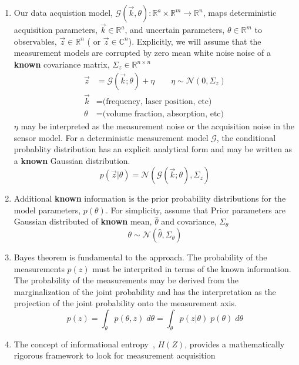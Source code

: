\documentclass{article}         %
\theoremstyle{definition}
\theoremstyle{remark}
\begin{document}
\begin{enumerate}
  \item Our data acquistion model, $\mathcal{G}(\vec{k},\theta): \mathbb{R}^a
\times \mathbb{R}^m \rightarrow \mathbb{R}^n $,
maps deterministic acquisition
parameters, $\vec{k} \in \mathbb{R}^a$, and uncertain parameters, $\theta \in \mathbb{R}^m$
to observables, $\vec{z} \in \mathbb{R}^n$ ( or $\vec{z} \in \mathbb{C}^n$).
Explicitly, we will assume that the
measurement models are corrupted by zero mean white noise noise of a
\textbf{known} covariance matrix, $\Sigma_z \in \mathbb{R}^{n \times n}$ 
\begin{equation}
\label{sensormodelstructure}
\begin{split}
  \vec{z} & = \mathcal{G}(\vec{k};\theta) + \eta   \qquad   \eta \sim \mathcal{N}(0,\Sigma_z)
      \\
  \vec{k} & =  \text{(frequency, laser position, etc)}
      \\
  \theta &  =  \text{(volume fraction, absorption, etc)}
     \end{split}
\end{equation}
$\eta$ may be interpreted as the measurement noise or the acquisition noise
in the sensor model. For a deterministic measurement model $\mathcal{G}$,
the conditional probablity distribution has an explicit analytical form
and may be written as a  \textbf{known} Gaussian
distribution. 
  \[ 
      p(\vec{z}|\theta)   =  \mathcal{N}(\mathcal{G}(\vec{k};\theta),\Sigma_z)  
  \]
  \item Additional \textbf{known} information is the prior probability
distributions for the model parameters, $p(\theta)$.  For simplicity,
    assume that Prior parameters are Gaussian distributed of 
   \textbf{known} mean, $\hat{\theta}$ and covariance, $\Sigma_\theta$
   \[
      \theta \sim \mathcal{N} (\hat{\theta}, \Sigma_\theta)
   \]
  \item Bayes theorem is fundamental to the approach.
The probability of the measurements $p(z)$ must be interprited in terms of the
known information. The probability of the measurements may be derived from
the marginalization of the joint probability and has the interpretation as
the projection of the joint probability onto the measurement axis.
\[
  p(z) = \int_\theta p(\theta,z)  \; d\theta 
       = \int_\theta p(z|\theta) \; p(\theta)\; d\theta 
\]
  \item  The concept of informational entropy~\cite{Madankan15}, $H(Z)$,
provides a mathematically rigorous framework to look for measurement acquisition

\end{enumerate}
\end{document}
